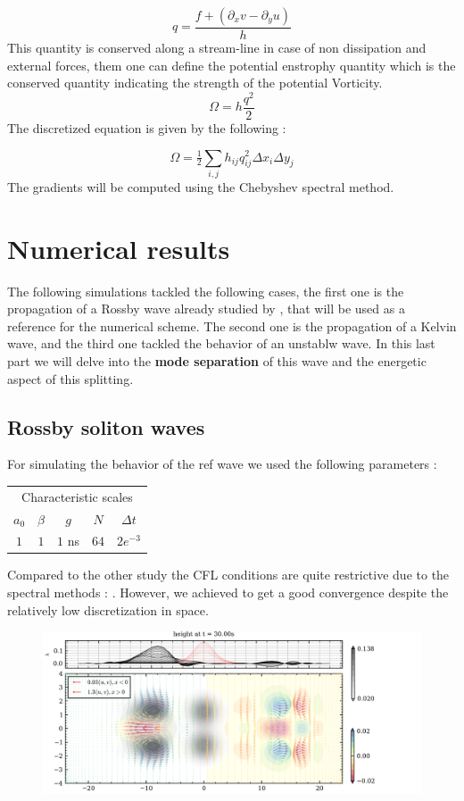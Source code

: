 \documentclass[11pt,a4paper]{report}
\begin{document}
\begin{multicols}{2}
    $$q = \frac{f + (\partial_x v - \partial_y u)}{h}$$
    This quantity is conserved along a stream-line in case of non dissipation and external forces, them one can define the potential enstrophy quantity which is the conserved quantity indicating the strength of the potential Vorticity.
    $$\Omega = h \frac{q^2}{2}$$
    The discretized equation is given by the following :

    $$\Omega = \tfrac{1}{2}\sum_{i,j}h_{ij}q_{ij}^2\Delta x_i\Delta y_j  $$
    The gradients will be computed using the Chebyshev spectral method.

    \section{Numerical results}
    The following simulations tackled the following cases, the first one is the propagation of a Rossby wave already studied by \cite{CF}, that will be used as a reference for the numerical scheme. The second one is the propagation of a Kelvin wave, and the third one tackled the behavior of an unstablw wave.
    In this last part we will delve into the \textbf{mode separation} of this wave and the energetic aspect of this splitting.
    \subsection{Rossby soliton waves}
    For simulating the behavior of the ref wave we used the following parameters :

    \begin{center}
        \begin{tabular}{ccccc}
            \toprule
            \multicolumn{5}{c}{Characteristic scales}    \\
            \cmidrule{1 -5}
            $a_0$ & $\beta$ & $g$    & $N$  & $\Delta t$ \\
            \midrule
            $1$   & $1$     & $1$ ns & $64$ & $2e^{-3}$  \\
            \bottomrule
        \end{tabular}
    \end{center}
    Compared to the other study the CFL conditions are quite restrictive due to the spectral methods : \cite{CF}.
    However,  we achieved to get a good convergence despite the relatively low discretization in space.
\end{multicols}
\begin{figure}[H]
    \centering
    \includegraphics[width=\textwidth]{./figure/soliton.png}
\end{figure}
\end{document}
